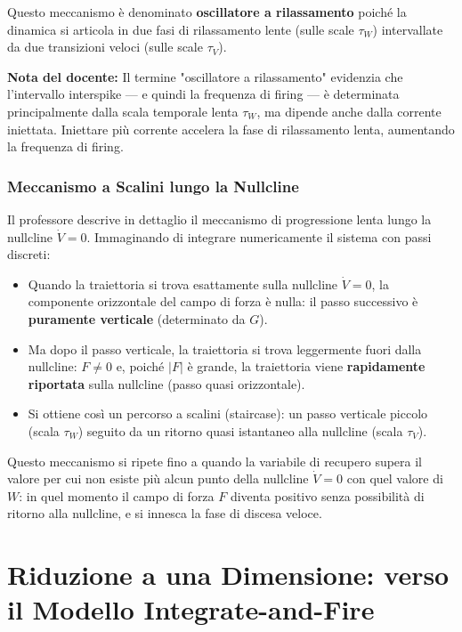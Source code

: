 Questo meccanismo è denominato \textbf{oscillatore a rilassamento} poiché la dinamica si articola in due fasi di rilassamento lente (sulle scale $\tau_W$) intervallate da due transizioni veloci (sulle scale $\tau_V$).

\begin{tcolorbox}[colback=gray!5, colframe=gray!40, arc=2mm, boxrule=0.5pt]
\textbf{Nota del docente:} Il termine "oscillatore a rilassamento" evidenzia che l'intervallo interspike — e quindi la frequenza di firing — è determinata principalmente dalla scala temporale lenta $\tau_W$, ma dipende anche dalla corrente iniettata. Iniettare più corrente accelera la fase di rilassamento lenta, aumentando la frequenza di firing.
\end{tcolorbox}

\subsubsection{Meccanismo a Scalini lungo la Nullcline}

Il professore descrive in dettaglio il meccanismo di progressione lenta lungo la nullcline $\dot{V}=0$. Immaginando di integrare numericamente il sistema con passi discreti:

\begin{itemize}
    \item Quando la traiettoria si trova esattamente sulla nullcline $\dot{V}=0$, la componente orizzontale del campo di forza è nulla: il passo successivo è \textbf{puramente verticale} (determinato da $G$).
    \item Ma dopo il passo verticale, la traiettoria si trova leggermente fuori dalla nullcline: $F \neq 0$ e, poiché $|F|$ è grande, la traiettoria viene \textbf{rapidamente riportata} sulla nullcline (passo quasi orizzontale).
    \item Si ottiene così un percorso a scalini (staircase): un passo verticale piccolo (scala $\tau_W$) seguito da un ritorno quasi istantaneo alla nullcline (scala $\tau_V$).
\end{itemize}

Questo meccanismo si ripete fino a quando la variabile di recupero supera il valore per cui non esiste più alcun punto della nullcline $\dot{V}=0$ con quel valore di $W$: in quel momento il campo di forza $F$ diventa positivo senza possibilità di ritorno alla nullcline, e si innesca la fase di discesa veloce.

\section{Riduzione a una Dimensione: verso il Modello Integrate-and-Fire}

